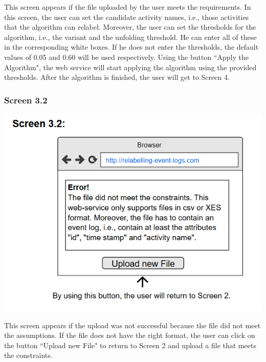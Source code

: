 \documentclass[notitlepage]{article}
\begin{document}
\begin{flushleft}
This screen appears if the file uploaded by the user meets the requirements. In this screen, the user can set the candidate activity names, i.e., those activities that the algorithm can relabel. Moreover, the user can set the thresholds for the algorithm, i.e., the variant and the unfolding threshold. He can enter all of these in the corresponding white boxes. If he does not enter the thresholds, the default values of 0.05 and 0.60 will be used respectively. Using the button ``Apply the Algorithm", the web service will start applying the algorithm using the provided thresholds. After the algorithm is finished, the user will get to Screen 4.

\subsubsection{Screen 3.2}
\includegraphics[scale=0.9]{InterfaceMockup3-2.png}

This screen appears if the upload was not successful because the file did not meet the assumptions. If the file does not have the right format, the user can click on the button ``Upload new File" to return to Screen 2 and upload a file that meets the constraints.



\end{flushleft}
\end{document}

